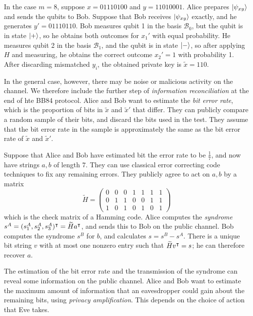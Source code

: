 In the case \( m = 8 \), suppose \( x = 01110100 \) and \( y = 11010001 \).
Alice prepares \( \ket{\psi_{xy}} \) and sends the qubits to Bob.
Suppose that Bob receives \( \ket{\psi_{xy}} \) exactly, and he generates \( y' = 01110110 \).
Bob measures qubit 1 in the basis \( \mathcal B_0 \), but the qubit is in state \( \ket{+} \), so he obtains both outcomes for \( x_1' \) with equal probability.
He measures qubit 2 in the basis \( \mathcal B_1 \), and the qubit is in state \( \ket{-} \), so after applying \( H \) and measuring, he obtains the correct outcome \( x_2' = 1 \) with probability 1.
After discarding mismatched \( y_i \), the obtained private key is \( \widetilde x = 110 \).

In the general case, however, there may be noise or malicious activity on the channel.
We therefore include the further step of \emph{information reconciliation} at the end of hte BB84 protocol.
Alice and Bob want to estimate the \emph{bit error rate}, which is the proportion of bits in \( \widetilde x \) and \( \widetilde x' \) that differ.
They can publicly compare a random sample of their bits, and discard the bits used in the test.
They assume that the bit error rate in the sample is approximately the same as the bit error rate of \( \widetilde x \) and \( \widetilde x' \).

Suppose that Alice and Bob have estimated bit the error rate to be \( \frac{1}{7} \), and now have strings \( a, b \) of length \( 7 \).
They can use classical error correcting code techniques to fix any remaining errors.
They publicly agree to act on \( a, b \) by a matrix
\[ \widetilde H = \begin{pmatrix}
    0 & 0 & 0 & 1 & 1 & 1 & 1 \\
    0 & 1 & 1 & 0 & 0 & 1 & 1 \\
    1 & 0 & 1 & 0 & 1 & 0 & 1
\end{pmatrix} \]
which is the check matrix of a Hamming code.
Alice computes the \emph{syndrome} \( s^A = (s_1^A, s_2^A, s_3^A)^\intercal = \widetilde H a^\intercal \), and sends this to Bob on the public channel.
Bob computes the syndrome \( s^B \) for \( b \), and calculates \( s = s^B - s^A \).
There is a unique bit string \( v \) with at most one nonzero entry such that \( \widetilde H v^\intercal = s \); he can therefore recover \( a \).

The estimation of the bit error rate and the transmission of the syndrome can reveal some information on the public channel.
Alice and Bob want to estimate the maximum amount of information that an eavesdropper could gain about the remaining bits, using \emph{privacy amplification}.
This depends on the choice of action that Eve takes.

